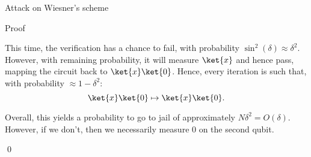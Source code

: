 \documentclass[a4paper]{article}
\begin{document}
\begin{parag}{Attack on Wiesner's scheme}
\begin{subparag}{Proof}
\begin{itemize}[left=0pt]
                This time, the verification has a chance to fail, with probability $\sin^2\left(\delta\right) \approx \delta^2$. However, with remaining probability, it will measure $\ket{x}$ and hence pass, mapping the circuit back to $\ket{x}\ket{0}$. Hence, every iteration is such that, with probability $\approx 1 - \delta^2$: 
                \[\ket{x}\ket{0} \mapsto \ket{x}\ket{0}.\]
                
                Overall, this yields a probability to go to jail of approximately $N \delta^2 = O\left(\delta\right)$. However, if we don't, then we necessarily measure $0$ on the second qubit.
        \end{itemize}

        \qed
    \end{subparag}
\end{parag}
\end{document}
